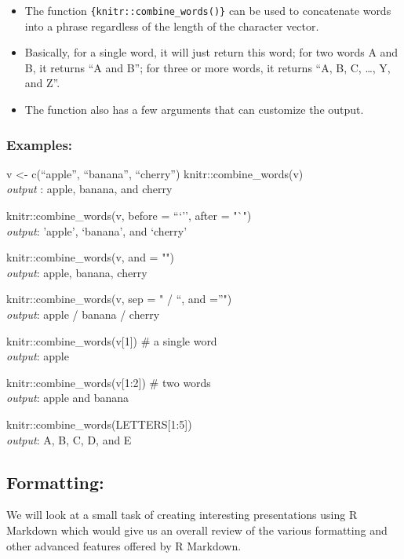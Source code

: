 \documentclass[
]{article}
\providecommand{\tightlist}{%
  \setlength{\itemsep}{0pt}\setlength{\parskip}{0pt}}
\begin{document}
\begin{itemize}
\tightlist
\item
  The function \texttt{\{knitr::combine\_words()\}} can be used to
  concatenate words into a phrase regardless of the length of the
  character vector.
\item
  Basically, for a single word, it will just return this word; for two
  words A and B, it returns ``A and B''; for three or more words, it
  returns ``A, B, C, \ldots, Y, and Z''.
\item
  The function also has a few arguments that can customize the output.
\end{itemize}

\hypertarget{examples}{%
\subsubsection{Examples:}\label{examples}}

v \textless- c(``apple'', ``banana'', ``cherry'')
knitr::combine\_words(v)\\
\emph{output} : apple, banana, and cherry

knitr::combine\_words(v, before = ```'', after = "`")\\
\emph{output}: 'apple', `banana', and `cherry'

knitr::combine\_words(v, and = "")\\
\emph{output}: apple, banana, cherry

knitr::combine\_words(v, sep = " / ``, and =''")\\
\emph{output}: apple / banana / cherry

knitr::combine\_words(v{[}1{]}) \# a single word\\
\emph{output}: apple

knitr::combine\_words(v{[}1:2{]}) \# two words\\
\emph{output}: apple and banana

knitr::combine\_words(LETTERS{[}1:5{]})\\
\emph{output}: A, B, C, D, and E

\hypertarget{formatting}{%
\subsection{Formatting:}\label{formatting}}

We will look at a small task of creating interesting presentations using
R Markdown which would give us an overall review of the various
formatting and other advanced features offered by R Markdown.
\end{document}
